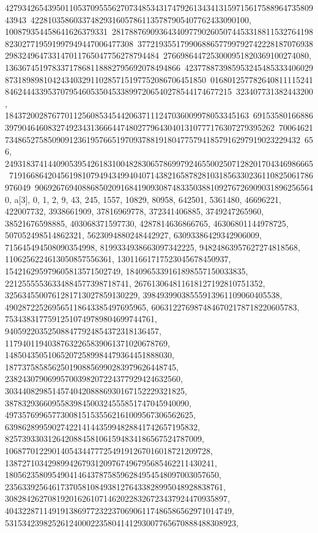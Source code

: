 {{{42793426543950110537095556270734853431747926134341315971561758896473580943943\
422810358603374829316057861135787905407762433090100, 100879354458641626379331\
28178876909364340977902605074453318811532764198823027719591997949447006477308\
37721935517990688657799792742228187076938298324964733147011765047756278794484\
2766986447253000951820369100274080, 13636745197833717868118882795692078494866\
42377887398595324548533340602987318989810424340329110285715197752086706451850\
01680125778264081111524184624443395370795460535045338997206540278544174677215\
323407731382443200, 184372002876770112560853454420637111247036009978053345163\
69153580166886397904646083274923431366644748027796430401310777176307279395262\
70064621734865275850909123619576651970937881918047757941857916297919023229432\
656, 249318374144090539542618310048283065786997924655002507128201704346986665\
71916686420456198107949434994040714382165878281031856330236110825061786976049\
906926769408868502091684190930874833503881092767269090318962565640}}, 
 {a[3], {0, 1, 2, 9, 43, 245, 1557, 10829, 80958, 642501, 5361480, 46696221, 
   422007732, 3938661909, 37816969778, 372341406885, 3749247265960, 
   38521676598885, 403068371597730, 4287814636866765, 46306801144978725, 
   507052498514862321, 5623094880248442927, 63093386429342906009, 
   715645494508090354998, 8199334938663097342225, 94824863957627274818568, 
   1106256224613050857556361, 13011661717523045678450937, 
   154216295979605813571502749, 1840965339161898557150033835, 
   22125555536334884577398718741, 267613064811618127192810751352, 
   3256345500761281713027859130229, 39849399038555913961109060405538, 
   490287225269565118643385497695965, 6063122769874846702178718220605783, 
   75343831775912510749789804699744761, 940592203525088477924854372318136457, 
   11794011940387632265839061371020678769, 
   148504350510652072589984479364451888030, 
   1877375858562501908856990283979626448745, 
   23824307906995700398207224377929424632560, 
   303440829851457404208886930167152229321825, 
   3878329366095583984500324555851747045940090, 
   49735769965773008151535562161009567306562625, 
   639862899590274221414435994828841742657195832, 
   8257393303126420884581061594834186567524787009, 
   106877012290140543447772549191267016018721209728, 
   1387271034298994267931209767496795685462211430241, 
   18056235809549041464378758596284954548097003057650, 
   235633925646173705810849381276433828995048928838761, 
   3082842627081920162610714620228326723437924470935897, 
   40432287114919138697723223706906117486586562971014749, 
   531534239825261240002235804141293007765670888488308923, 
}}}
